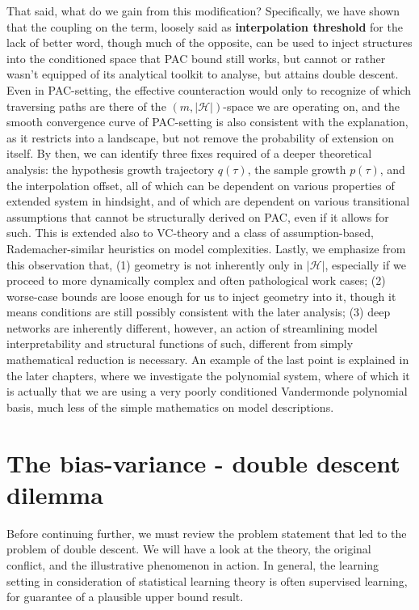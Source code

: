 That said, what do we gain from this modification? Specifically, we have shown that the coupling on the term, loosely said as \textbf{interpolation threshold} for the lack of better word, though much of the opposite, can be used to inject structures into the conditioned space that PAC bound still works, but cannot or rather wasn't equipped of its analytical toolkit to analyse, but attains double descent. Even in PAC-setting, the effective counteraction would only to recognize of which traversing paths are there of the $(m,|\mathcal{H}|)$-space we are operating on, and the smooth convergence curve of PAC-setting is also consistent with the explanation, as it restricts into a landscape, but not remove the probability of extension on itself. By then, we can identify three fixes required of a deeper theoretical analysis: the hypothesis growth trajectory $q(\tau)$, the sample growth $p(\tau)$, and the interpolation offset, all of which can be dependent on various properties of extended system in hindsight, and of which are dependent on various transitional assumptions that cannot be structurally derived on PAC, even if it allows for such. This is extended also to VC-theory and a class of assumption-based, Rademacher-similar heuristics on model complexities. Lastly, we emphasize from this observation that, (1) geometry is not inherently only in $|\mathcal{H}|$, especially if we proceed to more dynamically complex and often pathological work cases; (2) worse-case bounds are loose enough for us to inject geometry into it, though it means conditions are still possibly consistent with the later analysis; (3) deep networks are inherently different, however, an action of streamlining model interpretability and structural functions of such, different from simply mathematical reduction is necessary. An example of the last point is explained in the later chapters, where we investigate the polynomial system, where of which it is actually that we are using a very poorly conditioned Vandermonde polynomial basis, much less of the simple mathematics on model descriptions. 

\section{The bias-variance - double descent dilemma}

Before continuing further, we must review the problem statement that led to the problem of double descent. We will have a look at the theory, the original conflict, and the illustrative phenomenon in action. In general, the learning setting in consideration of statistical learning theory is often supervised learning, for guarantee of a plausible upper bound result. 


